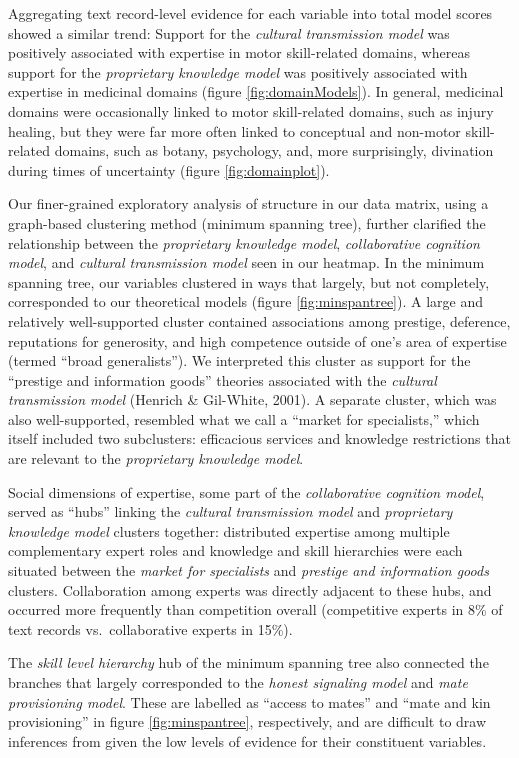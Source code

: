 \documentclass[
  11pt,
]{article}
\begin{document}
Aggregating text record-level evidence for each variable into total model scores showed a similar trend: Support for the \emph{cultural transmission model} was positively associated with expertise in motor skill-related domains, whereas support for the \emph{proprietary knowledge model} was positively associated with expertise in medicinal domains (figure \ref{fig:domainModels}). In general, medicinal domains were occasionally linked to motor skill-related domains, such as injury healing, but they were far more often linked to conceptual and non-motor skill-related domains, such as botany, psychology, and, more surprisingly, divination during times of uncertainty (figure \ref{fig:domainplot}).

Our finer-grained exploratory analysis of structure in our data matrix, using a graph-based clustering method (minimum spanning tree), further clarified the relationship between the \emph{proprietary knowledge model}, \emph{collaborative cognition model}, and \emph{cultural transmission model} seen in our heatmap. In the minimum spanning tree, our variables clustered in ways that largely, but not completely, corresponded to our theoretical models (figure \ref{fig:minspantree}). A large and relatively well-supported cluster contained associations among prestige, deference, reputations for generosity, and high competence outside of one's area of expertise (termed ``broad generalists''). We interpreted this cluster as support for the ``prestige and information goods'' theories associated with the \emph{cultural transmission model} (Henrich \& Gil-White, 2001). A separate cluster, which was also well-supported, resembled what we call a ``market for specialists,'' which itself included two subclusters: efficacious services and knowledge restrictions that are relevant to the \emph{proprietary knowledge model}.

Social dimensions of expertise, some part of the \emph{collaborative cognition model}, served as ``hubs'' linking the \emph{cultural transmission model} and \emph{proprietary knowledge model} clusters together: distributed expertise among multiple complementary expert roles and knowledge and skill hierarchies were each situated between the \emph{market for specialists} and \emph{prestige and information goods} clusters. Collaboration among experts was directly adjacent to these hubs, and occurred more frequently than competition overall (competitive experts in 8\% of text records vs.~collaborative experts in 15\%).

The \emph{skill level hierarchy} hub of the minimum spanning tree also connected the branches that largely corresponded to the \emph{honest signaling model} and \emph{mate provisioning model}. These are labelled as ``access to mates'' and ``mate and kin provisioning'' in figure \ref{fig:minspantree}, respectively, and are difficult to draw inferences from given the low levels of evidence for their constituent variables.
\end{document}
